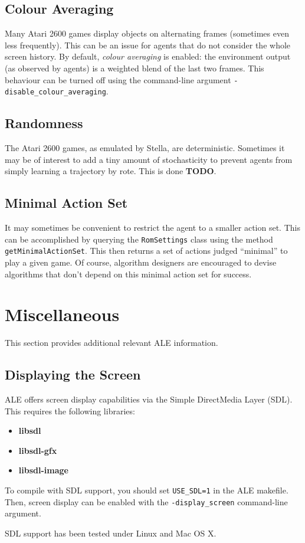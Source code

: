\documentclass[12pt]{article}
\begin{document}
\subsection{Colour Averaging}

Many Atari 2600 games display objects on alternating frames (sometimes even less frequently).
This can be an issue for agents that do not consider the whole screen history. By default, 
\emph{colour averaging} is enabled: the environment output (as observed by agents) is a weighted
blend of the last two frames. This behaviour can be turned off using the command-line argument 
\verb+-disable_colour_averaging+. 

\subsection{Randomness}

The Atari 2600 games, as emulated by Stella, are deterministic. Sometimes it may be of interest
to add a tiny amount of stochasticity to prevent agents from simply learning a trajectory by
rote. This is done \textbf{TODO}.

\subsection{Minimal Action Set}

It may sometimes be convenient to restrict the agent to a smaller action set. This can be
accomplished by querying the \verb+RomSettings+ class using the method 
\verb+getMinimalActionSet+. This then returns a set of actions judged ``minimal'' to play a given
game. Of course, algorithm designers are encouraged to devise algorithms that don't depend 
on this minimal action set for success.

\section{Miscellaneous}

This section provides additional relevant ALE information.

\subsection{Displaying the Screen}

ALE offers screen display capabilities via the Simple DirectMedia Layer (SDL). This requires
the following libraries:

\begin{itemize}
  \item{\textbf{libsdl}}
  \item{\textbf{libsdl-gfx}}
  \item{\textbf{libsdl-image}}
\end{itemize}

To compile with SDL support, you should set \verb+USE_SDL=1+ in the ALE makefile. Then, screen
display can be enabled with the \verb+-display_screen+ command-line argument. 

SDL support has been tested under Linux and Mac OS X. 
\end{document}

